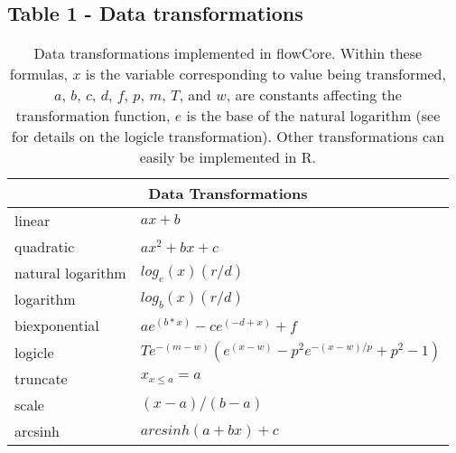 \documentclass[10pt]{bmc_article}
\newcommand{\Rpackage}[1]{{\textsf{#1}}}
\newenvironment{bmcformat}{\begin{raggedright}\baselineskip20pt\sloppy\setboolean{publ}{false}}{\end{raggedright}\baselineskip20pt\sloppy}
\begin{document}
\begin{bmcformat}
  \subsection*{Table 1 - Data transformations}
    \begin{table}[ht]
      \caption{\label{table1} Data transformations implemented in \Rpackage{flowCore}. Within these formulas, $x$ is the variable
        corresponding to value being transformed, $a$, $b$, $c$, $d$, $f$, $p$, $m$, $T$, and $w$, are
        constants affecting the transformation function, $e$ is the base of the natural logarithm (see \cite{Parks:2006} for details on the logicle transformation). Other transformations can easily be implemented in R.}
      \begin{center}
        \begin{tabular}{|l|l|}
          \hline
          \multicolumn{2}{|c|}{Data Transformations} \\
          \hline
          linear & $ax + b$ \\
          quadratic & $ax^2 + bx + c$ \\
          natural logarithm & $log_e(x)(r/d)$ \\
          logarithm & $log_b(x)(r/d)$ \\
          biexponential & $ae^{(b*x)}-ce^{(-d+x)}+f$ \\
          logicle& $Te^{-(m-w)}(e^{(x-w)}-p^2e^{-(x-w)/p}+p^2-1)$ \\
          truncate & $x_{x{\leq}a} = a$ \\
          scale & $(x-a)/(b-a)$ \\
          arcsinh & $arcsinh(a + bx)+c$ \\
          \hline
        \end{tabular}
      \end{center}
    \end{table}


\end{bmcformat}
\end{document}
